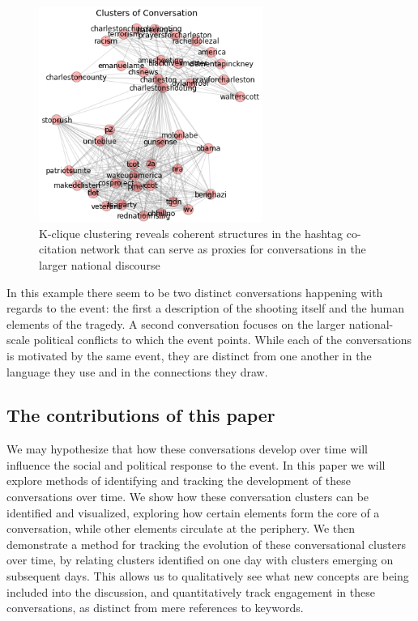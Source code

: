 \documentclass[12pt]{article}
\begin{document}
\begin{figure}[!ht]
  \centering
    \includegraphics[width=0.65\textwidth]{F2_Basic_Clusters.png}
    \caption{K-clique  clustering  reveals  coherent  structures  in the  hashtag  co-citation  network  that  can  serve  as  proxies  for conversations in the larger national discourse}
  \label{fig:basic_clusters}
\end{figure}

In this example there seem to be two distinct conversations happening with regards to the event: the first a description of the shooting itself and the human elements of the tragedy. 
A second conversation focuses on the larger national-scale political conflicts to which the event points. 
While each of the conversations is motivated by the same event, they are distinct from one another in the language they use and in the connections they draw.

\subsection{The contributions of this paper}
We may hypothesize that how these conversations develop over time will influence the social and political response to the event. 
In this paper we will explore methods of identifying and tracking the development of these conversations over time. We show how these conversation clusters can be identified and visualized, exploring how certain elements form the core of a conversation, while other elements circulate at the periphery. We then demonstrate a method for tracking the evolution of these conversational clusters over time, by relating clusters identified on one day with clusters emerging on subsequent days. This allows us to qualitatively see what new concepts are being included into the discussion, and quantitatively track engagement in these conversations, as distinct from mere references to keywords.
\end{document}
